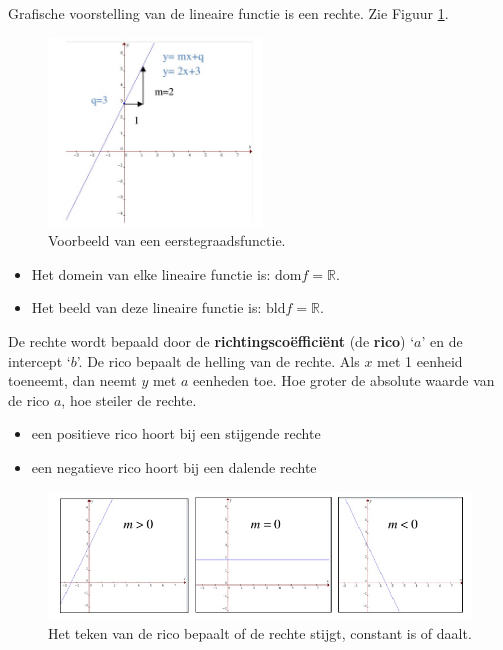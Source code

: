 Grafische voorstelling van de lineaire functie is een rechte.
Zie Figuur \ref{fig:eerstegr}.

\begin{figure}[h]
\centering{}\includegraphics[height=5cm]{2_elem_rekenvaardigheden_B/inputs/eerstegraadsfuncties1.jpg} 
\caption{Voorbeeld van een eerstegraadsfunctie.}
\label{fig:eerstegr}
\end{figure}

\begin{itemize}
	\item Het domein van elke lineaire functie is: $\textrm{dom} f = \mathbb{R}$.
	\item Het beeld van deze lineaire functie is: $\textrm{bld} f = \mathbb{R}$.
\end{itemize}

De rechte wordt bepaald door de \textbf{richtingsco\"effici\"ent}
(de \textbf{rico}) \textquoteleft $a$\textquoteright{} en de intercept
\textquoteleft $b$\textquoteright . De rico bepaalt de helling van
de rechte. Als $x$ met 1 eenheid toeneemt, dan neemt $y$ met $a$
eenheden toe. Hoe groter de absolute waarde van de rico $a$, hoe
steiler de rechte.
\begin{itemize}
\item een positieve rico hoort bij een stijgende rechte
\item een negatieve rico hoort bij een dalende rechte
\end{itemize}
\begin{figure}[h]
\centering{}\includegraphics[width=\linewidth]{2_elem_rekenvaardigheden_B/inputs/eerstegraadsfuncties2.jpg} 
\caption{Het teken van de rico bepaalt of de rechte stijgt, constant is of daalt.}
\label{fig:rico}
\end{figure}

